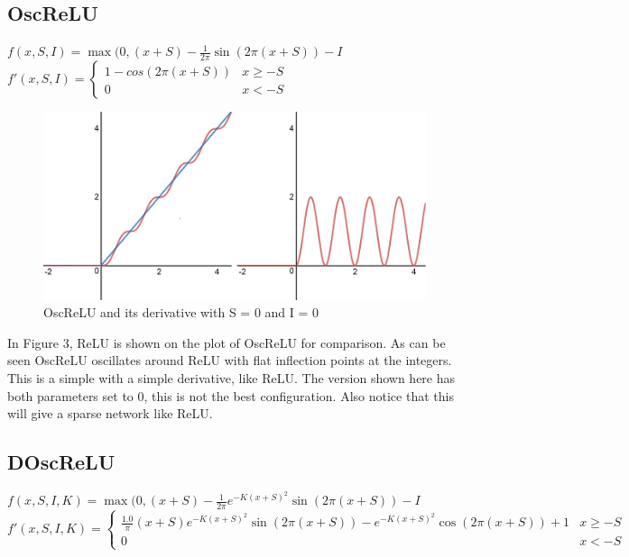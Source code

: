 \documentclass{amsart}
\theoremstyle{definition}
\theoremstyle{remark}
\numberwithin{equation}{section}
\newcommand{\blankbox}[2]{%
  \parbox{\columnwidth}{\centering
    \setlength{\fboxsep}{0pt}%
    \fbox{\raisebox{0pt}[#2]{\hspace{#1}}}%
  }%
}
\begin{document}
\subsection{OscReLU}  \hfill \break 
\hfill\break
$f(x,S,I) = \max(0, (x + S) - \frac{1}{2\pi}\sin(2\pi (x+S)) - I$ \hfill \break
\hfill\break
$f'(x,S,I) = \begin{cases} 1 - cos(2\pi (x+S)) & x \geq -S \\ 0 & x < -S\end{cases}$ \hfill \break

\begin{figure}[!h]
\includegraphics[1]{OscReLU_with_ReLU_Derive.png}
\caption{OscReLU and its derivative with S = 0 and I = 0}
\label{Figure 3}
\end{figure}  

In Figure 3, ReLU is shown on the plot of OscReLU for comparison. As can be seen OscReLU oscillates around ReLU with flat inflection points at the integers. This is a simple with a simple derivative, like ReLU. The version shown here has both parameters set to 0, this is not the best configuration.  Also notice that this will give a sparse network like ReLU.   

\subsection{DOscReLU}  \hfill \break 
\hfill\break
$f(x,S,I,K) = \max(0, (x + S) - \frac{1}{2\pi}e^{-K(x+S)^2}\sin(2\pi (x+S)) - I$ \hfill \break 
\hfill\break
$f'(x,S,I,K) = \begin{cases}\frac{1.0}{\pi}(x+S)e^{-K(x+S)^2}\sin(2\pi(x+S))-e^{-K(x+S)^2}\cos(2\pi(x+S)) + 1 & x \geq -S \\ 0 & x < -S \end{cases}$ \hfill \break 
\end{document}
